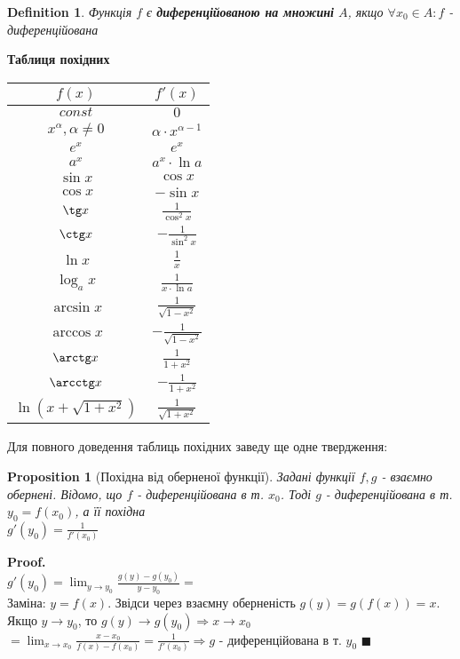 \documentclass[a4paper, 14pt]{extarticle}
\def\huge{\displaystyle}
\theoremstyle{theoremdd}
\theoremstyle{theoremdd}
\newtheorem{definition}[theorem]{Definition}
\theoremstyle{theoremdd}
\theoremstyle{theoremdd}
\theoremstyle{theoremdd}
\newtheorem{proposition}[theorem]{Proposition}
\theoremstyle{theoremdd}
\theoremstyle{theoremdd}
\theoremstyle{theoremdd}
\newenvironment{pf}{\vspace*{-3mm} \textbf{Proof. \\}}{$\blacksquare$}
\begin{document}
\begin{definition}
Функція $f$ є \textbf{диференційованою на множині} $A$, якщо $\forall x_0 \in A: f$ - диференційована
\end{definition}

\textbf{Таблиця похідних}
\begin{center}
\begin{tabular}{ c|c } 
 $f(x)$ & $f'(x)$ \\
 \hline 
 $const$ & $0$ \\ [2ex]
 \hline 
 $x^\alpha, \alpha \neq 0$ & $\alpha \cdot x^{\alpha-1}$ \\ [2ex]
 \hline 
 $e^x$ & $e^x$ \\ [2ex]
 \hline 
 $a^x$ & $a^x \cdot \ln a$ \\ [2ex]
 \hline 
 $\sin x$ & $\cos x$\\ [2ex]
 \hline 
 $\cos x$ & $-\sin x$\\ [2ex]
 \hline 
 $\tg x$ & $\huge \frac{1}{\cos^2 x}$\\ [2ex]
 \hline 
 $\ctg x$ & $-\huge \frac{1}{\sin^2 x}$\\ [2ex]
 \hline 
 $\ln x$ & $\huge \frac{1}{x}$\\ [2ex]
 \hline 
 $\log_a x$ & $\huge \frac{1}{x \cdot \ln a}$\\ [2ex]
 \hline 
 $\arcsin x$ & $\huge \frac{1}{\sqrt{1-x^2}}$\\ [2ex]
 \hline 
 $\arccos x$ & $\huge -\frac{1}{\sqrt{1-x^2}}$\\ [2ex]
 \hline 
 $\arctg x$ & $\huge \frac{1}{1+x^2}$\\ [2ex]
 \hline 
 $\arcctg x$ & $\huge -\frac{1}{1+x^2}$\\ [2ex]
 \hline 
 $\ln(x+\sqrt{1+x^2})$ & $\huge \frac{1}{\sqrt{1+x^2}}$\\ [2ex]
 \hline 
\end{tabular}
\end{center}
Для повного доведення таблиць похідних заведу ще одне твердження:
\begin{proposition}[Похідна від оберненої функції]
Задані функції $f,g$ - взаємно обернені. Відомо, що $f$ - диференційована в т. $x_0$. Тоді $g$ - диференційована в т. $y_0 = f(x_0)$, а її похідна\\
$g'(y_0) = \huge \frac{1}{f'(x_0)}$
\end{proposition}

\begin{pf}
$g'(y_0) = \huge \lim_{y \to y_0} \frac{g(y)-g(y_0)}{y-y_0} =$\\
Заміна: $y = f(x)$. Звідси через взаємну оберненість $g(y)=g(f(x))=x$. Якщо $y \to y_0$, то $g(y) \to g(y_0) \Rightarrow x \to x_0$\\
$= \huge \lim_{x \to x_0}\frac{x-x_0}{f(x)-f(x_0)} = \frac{1}{f'(x_0)} \Rightarrow g$ - диференційована в т. $y_0$
\end{pf}
\\
\end{document}
